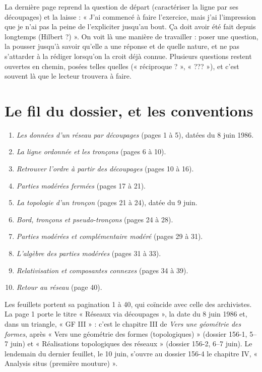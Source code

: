 \documentclass[11pt,a4paper]{article}
\begin{document}
\begin{resume}
La dernière page reprend la question de départ (caractériser la ligne par
ses découpages) et la laisse : « J'ai commencé à faire l'exercice, mais j'ai
l'impression que je n'ai pas la peine de l'expliciter jusqu'au bout. Ça doit
avoir été fait depuis longtemps (Hilbert ?) ». On voit là une manière de
travailler : poser une question, la pousser jusqu'à savoir qu'elle a une
réponse et de quelle nature, et ne pas s'attarder à la rédiger lorsqu'on la
croit déjà connue. Plusieurs questions restent ouvertes en chemin, posées
telles quelles (« réciproque ? », « ??? »), et c'est souvent là que le
lecteur trouvera à faire.

\end{resume}

\section*{Le fil du dossier, et les conventions}

\begin{enumerate}
\item[1.] \emph{Les données d'un réseau par découpages} (pages 1 à 5), datées
du 8 juin 1986.
\item[2.] \emph{La ligne ordonnée et les tronçons} (pages 6 à 10).
\item[3.] \emph{Retrouver l'ordre à partir des découpages} (pages 10 à 16).
\item[4.] \emph{Parties modérées fermées} (pages 17 à 21).
\item[5.] \emph{La topologie d'un tronçon} (pages 21 à 24), datée du 9 juin.
\item[6.] \emph{Bord, tronçons et pseudo-tronçons} (pages 24 à 28).
\item[7.] \emph{Parties modérées et complémentaire modéré} (pages 29 à 31).
\item[8.] \emph{L'algèbre des parties modérées} (pages 31 à 33).
\item[9.] \emph{Relativisation et composantes connexes} (pages 34 à 39).
\item[10.] \emph{Retour au réseau} (page 40).
\end{enumerate}

Les feuillets portent sa pagination 1 à 40, qui coïncide avec celle des
archivistes. La page 1 porte le titre « Réseaux via découpages », la date du
8 juin 1986 et, dans un triangle, « GF III » : c'est le chapitre III de
\emph{Vers une géométrie des formes}, après « Vers une géométrie des formes
(topologiques) » (dossier 156-1, 5--7 juin) et « Réalisations topologiques des
réseaux » (dossier 156-2, 6--7 juin). Le lendemain du dernier feuillet, le
10 juin, s'ouvre au dossier 156-4 le chapitre IV, « Analysis situs (première
mouture) ».
\end{document}
